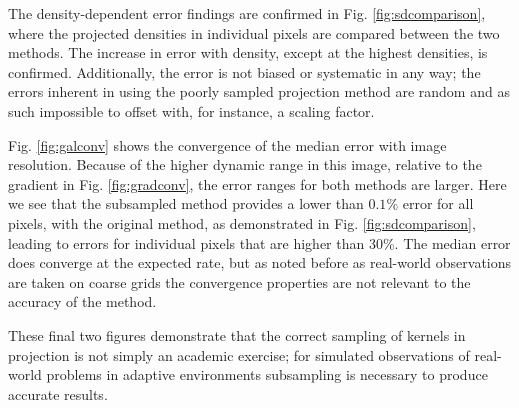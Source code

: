 The density-dependent error findings are confirmed in Fig. \ref{fig:sdcomparison}, where the projected densities in individual pixels are compared between the two methods. The increase in error with density, except at the highest densities, is confirmed. Additionally, the error is not biased or systematic in any way; the errors inherent in using the poorly sampled projection method are random and as such impossible to offset with, for instance, a scaling factor. 

Fig. \ref{fig:galconv} shows the convergence of the median error with image resolution. Because of the higher dynamic range in this image, relative to the gradient in Fig. \ref{fig:gradconv}, the error ranges for both methods are larger. Here we see that the subsampled method provides a lower than $0.1\%$ error for all pixels, with the original method, as demonstrated in Fig. \ref{fig:sdcomparison}, leading to errors for individual pixels that are higher than 30\%. The median error does converge at the expected rate, but as noted before as real-world observations are taken on coarse grids the convergence properties are not relevant to the accuracy of the method.

These final two figures demonstrate that the correct sampling of kernels in projection is not simply an academic exercise; for simulated observations of real-world problems in adaptive environments subsampling is necessary to produce accurate results.